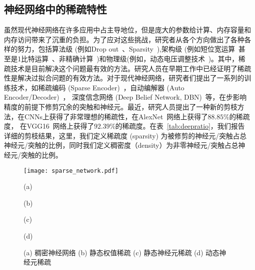 \subsection{神经网络中的稀疏特性}
虽然现代神经网络在许多应用中占主导地位，但是庞大的参数给计算、内存容量和内存访问带来了沉重的负担。为了应对这些挑战，研究者从各个方向做出了各种各样的努力，包括算法级 (例如Drop out~\cite{srivastava2014dropout}、Sparsity~\cite{han2015learning}),架构级 (例如短位宽运算~\cite{holi1993finite}甚至是1比特运算~\cite{rastegari2016xnor}、非精确计算~\cite{venkataramani2014axnn})和物理级(例如，动态电压调整技术~\cite{pillai2001real})。其中，稀疏技术是目前解决这个问题最有效的方法。研究人员在早期工作中已经证明了稀疏性是解决过拟合问题的有效方法。对于现代神经网络，研究者们提出了一系列的训练技术，如稀疏编码 (Sparse Encoder)~\cite{olshausen1996emergence}，自动编解器 (Auto Encoder/Decoder)~\cite{boureau2008sparse,lee2008sparse}， 深度信念网络 (Deep Belief Network, DBN)~\cite{lee2007efficient}等，在步影响精度的前提下修剪冗余的突触和神经元。最近，研究人员提出了一种新的剪枝方法，在CNNs上获得了非常理想的稀疏性，在AlexNet~\cite{krizhevsky2012imagenet}网络上获得了$88.85\%$的稀疏度， 在VGG16~\cite{simonyan2014very}网络上获得了$92.39\%$的稀疏度。在表~\ref{tab:deepratio}，我们报告详细的剪枝结果，这里，我们定义稀疏度 (sparsity) 为被修剪的神经元/突触占总神经元/突触的比例，同时我们定义稠密度（density）为非零神经元/突触占总神经元/突触的比例。


\begin{figure}[h]
  \centering
  \begin{minipage}[t]{\columnwidth}
  \texttt{[image: sparse\_network.pdf]}
  \end{minipage}
  \vfill
  \begin{minipage}[t]{0.24\columnwidth}
      \centering\footnotesize
    (a)
  \end{minipage}
  \hfill
  \begin{minipage}[t]{0.24\columnwidth}
      \centering\footnotesize
    (b)
  \end{minipage}
  \hfill
  \begin{minipage}[t]{0.24\columnwidth}
      \centering\footnotesize
    (c)
  \end{minipage}
    \hfill
  \begin{minipage}[t]{0.24\columnwidth}
      \centering\footnotesize
    (d)
  \end{minipage}
  \caption{ (a) 稠密神经网络 (b) 静态权值稀疏 (c) 静态神经元稀疏 (d) 动态神经元稀疏}
  \label{fig:sparsity}
\end{figure}

